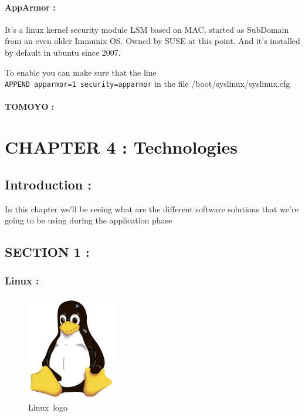 \documentclass[
  14pt,
  english,
  a4paper,
]{scrreprt}
\begin{document}
\hypertarget{apparmor}{%
\subsubsection{AppArmor :}\label{apparmor}}

It's a linux kernel security module LSM based on MAC, started as
SubDomain from an even older Immunix OS. Owned by SUSE at this point.
And it's installed by default in ubuntu since 2007.

To enable you can make sure that the line
\texttt{APPEND\ apparmor=1\ security=apparmor} in the file
/boot/syslinux/syslinux.cfg

\hypertarget{tomoyo}{%
\subsubsection{TOMOYO :}\label{tomoyo}}

\hypertarget{chapter-4-technologies}{%
\chapter{CHAPTER 4 : Technologies}\label{chapter-4-technologies}}

\hypertarget{introduction-6}{%
\section{Introduction :}\label{introduction-6}}

In this chapter we'll be seeing what are the different software
solutions that we're going to be using during the application phase

\hypertarget{section-1}{%
\section{SECTION 1 :}\label{section-1}}

\hypertarget{linux}{%
\subsection{Linux :}\label{linux}}

\begin{figure}
\centering
\includegraphics[width=0.35\textwidth,height=\textheight]{figures/Linux-logo.png}
\caption{Linux~logo}
\end{figure}
\end{document}
